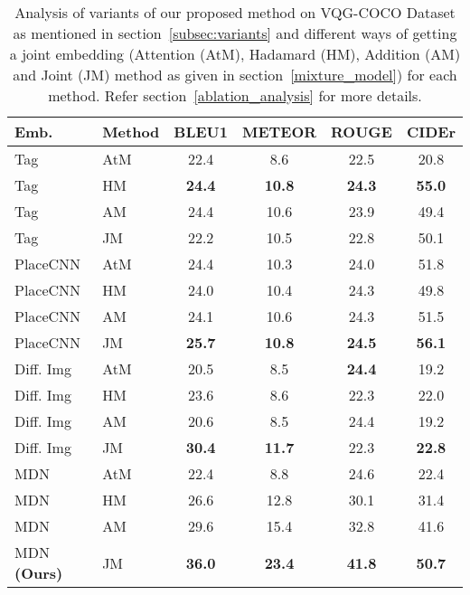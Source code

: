 \documentclass[11pt,a4paper]{article}
\begin{document}
\begin{table}[ht]
\scriptsize
\centering
\begin{tabular}{|l|l|cccc|}
\hline \bf Emb. & \bf Method & \bf BLEU1 & \bf METEOR & \bf ROUGE & \bf CIDEr \\ \hline 

Tag & AtM & 22.4 &8.6 & 22.5 & 20.8\\ 
Tag & HM & \textbf{24.4} &\textbf{10.8}& \textbf{24.3} & \textbf{55.0}\\
Tag & AM & 24.4 &10.6& 23.9 & 49.4\\
Tag& JM &22.2 &10.5 & 22.8 &50.1 \\ \hline

PlaceCNN & AtM &24.4  &10.3 &24.0 &51.8 \\
PlaceCNN & HM &24.0  &10.4 &24.3 &49.8 \\
PlaceCNN & AM & 24.1 & 10.6&24.3 &51.5 \\
PlaceCNN & JM &\textbf{25.7}  &\textbf{10.8 }&\textbf{24.5} &\textbf{56.1}  \\ \hline


Diff. Img & AtM & 20.5 &8.5 & \textbf{24.4} & 19.2\\ 
Diff. Img & HM& 23.6 &8.6 & 22.3 & 22.0\\
Diff. Img & AM & 20.6 &8.5 & 24.4 & 19.2\\ 
Diff. Img & JM & \textbf{30.4} & \textbf{11.7} & 22.3 & \textbf{22.8}\\ \hline


MDN & AtM & 22.4 &8.8 & 24.6 & 22.4\\ 
MDN & HM & 26.6 &12.8 & 30.1 & 31.4\\
MDN & AM & 29.6 &15.4 & 32.8 & 41.6\\ 
MDN \textbf{(Ours)} & JM & \textbf{36.0}&\textbf{23.4}&\textbf{41.8}& \textbf{50.7}\\\hline

\end{tabular}
\caption{\label{score_tab_1}Analysis of variants of our proposed method on VQG-COCO Dataset as mentioned in section~\ref{subsec:variants} and different ways of getting a joint embedding (Attention (AtM), Hadamard (HM), Addition (AM) and Joint (JM) method as given in section~\ref{mixture_model}) for each method. Refer section~\ref{ablation_analysis} for more details.
}
\vspace{-0.5cm}
\end{table}
\end{document}
